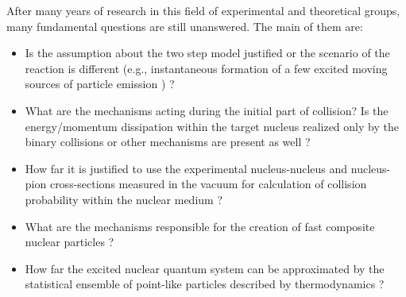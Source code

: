 After many years of research in this field of experimental and theoretical groups, many fundamental questions are still unanswered. The main of them are:
\begin{itemize}
    \item Is the assumption about the two step 
    model justified or the scenario of the reaction is different (e.g., instantaneous formation of a few excited moving sources of particle emission \cite{budzanowski2010comparison}) ? 
	\item What are the mechanisms acting during the initial part of collision? Is the energy/momentum dissipation within the target nucleus realized only by the binary collisions or other mechanisms are present as well ? 
	\item How far it is justified to use the experimental nucleus-nucleus and nucleus-pion cross-sections measured in the vacuum for calculation of collision probability within the nuclear medium ?
	\item What are the mechanisms responsible 
	for the creation of fast composite nuclear particles ?
	\item How far the excited nuclear quantum system can be approximated by the statistical ensemble of point-like particles described by thermodynamics ? 
\end{itemize}	




